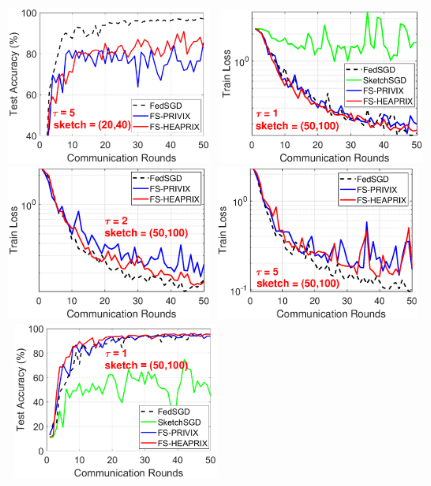 \documentclass[twoside]{article}
\begin{document}
\begin{figure}[h]
\begin{center}
{		\includegraphics[width=2.1in]{MNIST_figures/local5_sketch20_iid0_test_acc.eps}
		}
		\mbox{			    \includegraphics[width=2.1in]{MNIST_figures/local1_sketch50_iid0_train_loss.eps} \hspace{-0.2in}
		\includegraphics[width=2.1in]{MNIST_figures/local2_sketch50_iid0_train_loss.eps} \hspace{-0.2in}
		\includegraphics[width=2.1in]{MNIST_figures/local5_sketch50_iid0_train_loss.eps}
		}
		\mbox{
		\includegraphics[width=2.1in]{MNIST_figures/local1_sketch50_iid0_test_acc.eps} \hspace{-0.2in}
}
\end{center}
\end{figure}
\end{document}
